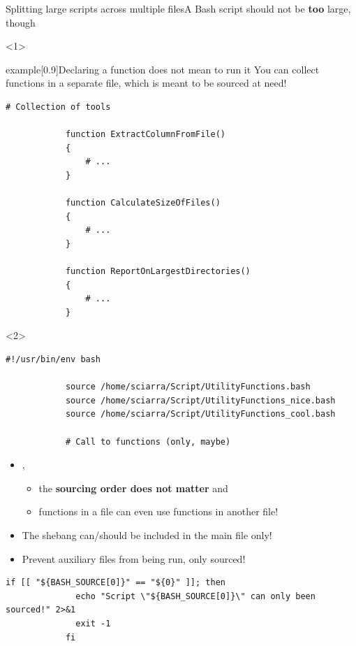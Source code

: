 \begin{frame}[fragile]{Splitting large scripts across multiple files}{A Bash script should not be \textbf{too} large, though}
    \begin{onlyenv}<1>
        \vspace{-3mm}
        \begin{varblock}{example}[0.9\textwidth]{Declaring a function does not mean to run it}
            You can collect functions in a separate file, which is meant to be sourced at need!
        \end{varblock}
        \begin{lstlisting}[style=MyBash, numbers=none]
            # Collection of tools

            function ExtractColumnFromFile()
            {
                # ...
            }

            function CalculateSizeOfFiles()
            {
                # ...
            }

            function ReportOnLargestDirectories()
            {
                # ...
            }
        \end{lstlisting}
    \end{onlyenv}
    \begin{onlyenv}<2>
        \begin{lstlisting}[style=MyBash, numbers=none, belowskip=-6mm]
            #!/usr/bin/env bash

            source /home/sciarra/Script/UtilityFunctions.bash
            source /home/sciarra/Script/UtilityFunctions_nice.bash
            source /home/sciarra/Script/UtilityFunctions_cool.bash

            # Call to functions (only, maybe)
        \end{lstlisting}
        \begin{itemize}
            \item {},
                  \begin{itemize}
                      \item the \textbf{sourcing order does not matter} and
                      \item functions in a file can even use functions in another file!
                  \end{itemize}
            \item The shebang can/should be included in the main file only!
            \item Prevent auxiliary files from being run, only sourced!
        \end{itemize}
        \begin{lstlisting}[style=MyBash, numbers=none, aboveskip=2mm, xleftmargin=1mm, xrightmargin=1mm]
            if [[ "${BASH_SOURCE[0]}" == "${0}" ]]; then
              echo "Script \"${BASH_SOURCE[0]}\" can only been sourced!" 2>&1
              exit -1
            fi
        \end{lstlisting}
    \end{onlyenv}
\end{frame}
